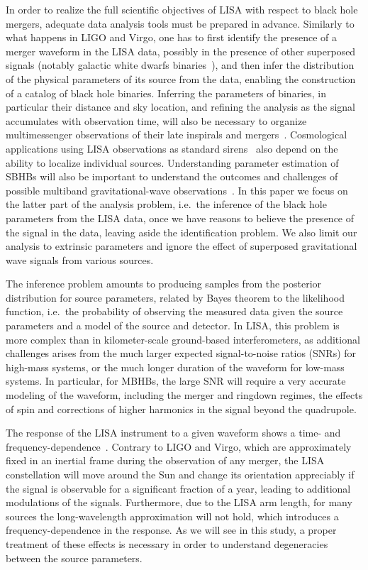 \documentclass[aps,showpacs,twocolumn,prd,superscriptaddress,nofootinbib]{revtex4-1}
\begin{document}
In order to realize the full scientific objectives of LISA with respect to black hole mergers, adequate data analysis tools must be prepared in advance. Similarly to what happens in LIGO and Virgo, one has to first identify the presence of a merger waveform in the LISA data, possibly in the presence of other superposed signals (notably galactic white dwarfs binaries~\cite{Nelemans+01}), and then infer the distribution of the physical parameters of its source from the data, enabling the construction of a catalog of black hole binaries. Inferring the parameters of binaries, in particular their distance and sky location, and refining the analysis as the signal accumulates with observation time, will also be necessary to organize multimessenger observations of their late inspirals and mergers~\cite{ArmitageNatarajan02, DalCanton+19}. Cosmological applications using LISA observations as standard sirens~\cite{Schutz86, Tamanini+16} also depend on the ability to localize individual sources. Understanding parameter estimation of SBHBs will also be important to understand the outcomes and challenges of possible multiband gravitational-wave observations~\cite{Sesana16}. In this paper we focus on the latter part of the analysis problem, i.e.~the inference of the black hole parameters from the LISA data, once we have reasons to believe the presence of the signal in the data, leaving aside the identification problem. We also limit our analysis to extrinsic parameters and ignore the effect of superposed gravitational wave signals from various sources.

The inference problem amounts to producing samples from the posterior distribution for source parameters, related by Bayes theorem to the likelihood function, i.e.~the probability of observing the measured data given the source parameters and a model of the source and detector. In LISA, this problem is more complex than in kilometer-scale ground-based interferometers, as additional challenges arises from the much larger expected signal-to-noise ratios (SNRs) for high-mass systems, or the much longer duration of the waveform for low-mass systems. In particular, for MBHBs, the large SNR will require a very accurate modeling of the waveform, including the merger and ringdown regimes, the effects of spin and corrections of higher harmonics in the signal beyond the quadrupole.

The response of the LISA instrument to a given waveform shows a time- and frequency-dependence~\cite{Cutler97, Larson+99, CR02, MB18}.
Contrary to LIGO and Virgo, which are approximately fixed in an inertial frame during the observation of any merger, the LISA constellation will move around the Sun and change its orientation appreciably if the signal is observable for a significant fraction of a year, leading to additional modulations of the signals. Furthermore, due to the LISA arm length, for many sources the long-wavelength approximation will not hold, which introduces a frequency-dependence in the response. As we will see in this study, a proper treatment of these effects is necessary in order to understand degeneracies between the source parameters.
\end{document}
